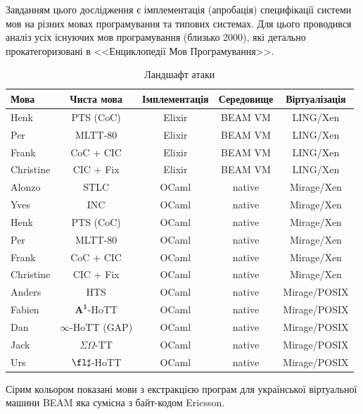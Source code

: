 Завданням цього дослідження є імплементація (апробація)
специфікації системи мов на різних мовах програмування та типових системах.
Для цього проводився аналіз усіх існуючих мов
програмування (близько 2000), які детально прокатегоризовані
в <<Енциклопедії Мов Програмування>>.

\begin{table}[ht]
 \caption{Ландшафт атаки}
  \begin{tabular}{lcccc}
   \hline
\rowcolor{ZimaBlue}
       \textbf{Мова} & \textbf{Чиста мова} & \textbf{Імплементація} & \textbf{Середовище} & \textbf{Віртуалізація} \\
   \hline
    \rowcolor{LightGray} Henk       & PTS (CoC)     & Elixir & BEAM VM  & LING/Xen \\
    \rowcolor{LightGray} Per        & MLTT-80       & Elixir & BEAM VM  & LING/Xen \\
    \rowcolor{LightGray} Frank      & CoC + CIC     & Elixir & BEAM VM  & LING/Xen \\
    \rowcolor{LightGray} Christine  & CIC + Fix     & Elixir & BEAM VM  & LING/Xen \\
   \hline
 Alonzo            & STLC                 & OCaml   & native & Mirage/Xen \\
 Yves              & INC                  & OCaml   & native & Mirage/Xen \\
   \hline
 Henk              & PTS (CoC)            & OCaml   & native & Mirage/Xen \\
 Per               & MLTT-80              & OCaml   & native & Mirage/Xen \\
 Frank             & CoC + CIC            & OCaml   & native & Mirage/Xen \\
 Christine         & CIC + Fix            & OCaml   & native & Mirage/Xen \\
   \hline
 Anders            & HTS                  & OCaml   & native & Mirage/POSIX \\
 Fabien            & $\mathbf{A^1}$-HoTT  & OCaml   & native & Mirage/POSIX \\
 Dan               & $\infty$-HoTT (GAP)  & OCaml   & native & Mirage/POSIX \\
 Jack              & $\Sigma\Omega$-TT    & OCaml   & native & Mirage/POSIX \\
 Urs               & $\fl\sharp$-HoTT     & OCaml   & native & Mirage/POSIX \\
   \hline
  \end{tabular}
  \small Сірим кольором показані мови з екстракцією програм для української віртуальної машини BEAM яка сумісна з байт-кодом Ericsson.
\end{table}

